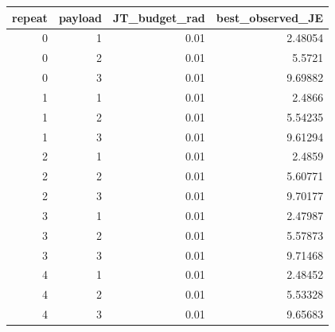 \begin{tabular}{rrrr}
\toprule
repeat & payload & JT\_budget\_rad & best\_observed\_JE \\
\midrule
0 & 1 & 0.01 & 2.48054 \\
0 & 2 & 0.01 & 5.5721 \\
0 & 3 & 0.01 & 9.69882 \\
1 & 1 & 0.01 & 2.4866 \\
1 & 2 & 0.01 & 5.54235 \\
1 & 3 & 0.01 & 9.61294 \\
2 & 1 & 0.01 & 2.4859 \\
2 & 2 & 0.01 & 5.60771 \\
2 & 3 & 0.01 & 9.70177 \\
3 & 1 & 0.01 & 2.47987 \\
3 & 2 & 0.01 & 5.57873 \\
3 & 3 & 0.01 & 9.71468 \\
4 & 1 & 0.01 & 2.48452 \\
4 & 2 & 0.01 & 5.53328 \\
4 & 3 & 0.01 & 9.65683 \\
\bottomrule
\end{tabular}
